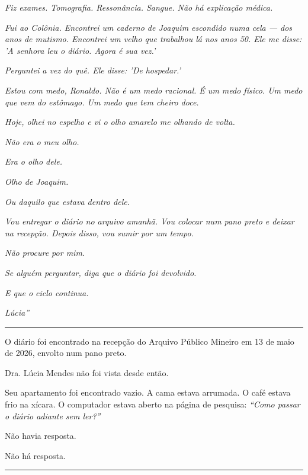 \noindent \textit{Fiz exames. Tomografia. Ressonância. Sangue. Não há explicação médica.}

\noindent \textit{Fui ao Colônia. Encontrei um caderno de Joaquim escondido numa cela --- dos anos de mutismo. Encontrei um velho que trabalhou lá nos anos 50. Ele me disse: 'A senhora leu o diário. Agora é sua vez.'}

\noindent \textit{Perguntei a vez do quê. Ele disse: 'De hospedar.'}

\noindent \textit{Estou com medo, Ronaldo. Não é um medo racional. É um medo físico. Um medo que vem do estômago. Um medo que tem cheiro doce.}

\noindent \textit{Hoje, olhei no espelho e vi o olho amarelo me olhando de volta.}

\noindent \textit{Não era o meu olho.}

\noindent \textit{Era o olho dele.}

\noindent \textit{Olho de Joaquim.}

\noindent \textit{Ou daquilo que estava dentro dele.}

\noindent \textit{Vou entregar o diário no arquivo amanhã. Vou colocar num pano preto e deixar na recepção. Depois disso, vou sumir por um tempo.}

\noindent \textit{Não procure por mim.}

\noindent \textit{Se alguém perguntar, diga que o diário foi devolvido.}

\noindent \textit{E que o ciclo continua.}

\noindent \textit{Lúcia\textquotedblright{}}

\vspace{0.5em}\noindent\rule{\textwidth}{0.5pt}\vspace{0.5em}

\noindent O diário foi encontrado na recepção do Arquivo Público Mineiro em 13 de maio de 2026, envolto num pano preto.

\noindent Dra. Lúcia Mendes não foi vista desde então.

\noindent Seu apartamento foi encontrado vazio. A cama estava arrumada. O café estava frio na xícara. O computador estava aberto na página de pesquisa: \textit{\textquotedblleft{}Como passar o diário adiante sem ler?\textquotedblright{}}

\noindent Não havia resposta.

\noindent Não há resposta.

\vspace{0.5em}\noindent\rule{\textwidth}{0.5pt}\vspace{0.5em}

